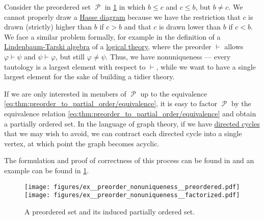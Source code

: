 \begin{example}\label{ex:preorder_nonuniqueness}
  Consider the preordered set \( \mscrP \) in \cref{fig:ex:preorder_nonuniqueness} in which \( b \leq c \) and \( c \leq b \), but \( b \neq c \). We cannot properly draw a \hyperref[def:hasse_diagram]{Hasse diagram} because we have the restriction that \( c \) is drawn (strictly) higher than \( b \) if \( c > b \) and that \( c \) is drawn lower than \( b \) if \( c < b \). We face a similar problem formally, for example in the definition of a \hyperref[def:lindenbaum_tarski_algebra]{Lindenbaum-Tarski algebra} of a \hyperref[def:first_order_theory]{logical theory}, where the preorder \( \vdash \) allows \( \varphi \vdash \psi \) and \( \psi \vdash \varphi \), but still \( \varphi \neq \psi \). Thus, we have nonuniqueness --- every tautology is a largest element with respect to \( \vdash \), while we want to have a single largest element for the sake of building a tidier theory.

  If we are only interested in members of \( \mscrP \) up to the equivalence \eqref{eq:thm:preorder_to_partial_order/equivalence}, it is easy to factor \( \mscrP \) by the equivalence relation \eqref{eq:thm:preorder_to_partial_order/equivalence} and obtain a partially ordered set. In the language of graph theory, if we have \hyperref[def:graph_cycle]{directed cycles} that we may wish to avoid, we can contract each directed cycle into a single vertex, at which point the graph becomes acyclic.

  The formulation and proof of correctness of this process can be found in  and an example can be found in \cref{fig:ex:preorder_nonuniqueness}.

  \begin{figure}
    \hfill
    \texttt{[image: figures/ex\_\_preorder\_nonuniqueness\_\_preordered.pdf]}
    \hfill
    \texttt{[image: figures/ex\_\_preorder\_nonuniqueness\_\_factorized.pdf]}
    \hfill\hfill
    \caption{A preordered set and its induced partially ordered set.}
    \label{fig:ex:preorder_nonuniqueness}
  \end{figure}
\end{example}

